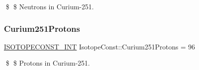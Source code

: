 \$ \$ Neutrons in Curium-\/251. \mbox{\label{group___isotope_const-_curium-_cm251_gaec0533f93917000f660ca512583e3932}} 
\subsubsection{\texorpdfstring{Curium251\+Protons}{Curium251Protons}}
{\footnotesize\ttfamily \mbox{\hyperlink{group___isotope_const-_macros_ga5f18360b3e99483a35c32d789e62621c}{I\+S\+O\+T\+O\+P\+E\+C\+O\+N\+S\+T\+\_\+\+I\+NT}} Isotope\+Const\+::\+Curium251\+Protons = 96}

\$ \$ Protons in Curium-\/251. 